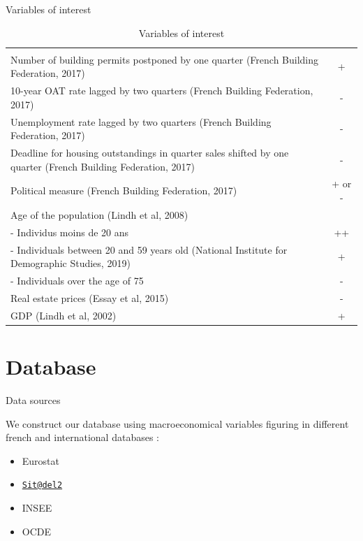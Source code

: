 \documentclass[11pt,ignorenonframetext,]{beamer}
\providecommand{\tightlist}{%
  \setlength{\itemsep}{0pt}\setlength{\parskip}{0pt}}
\begin{document}
\begin{frame}{Variables of interest}
\protect\hypertarget{variables-of-interest}{}

\tiny
\begin{table}[H]
\begin{tabular}{p{6cm} | c}
\hline \\[-1.8ex]
Number of building permits postponed by one quarter (French Building Federation, 2017) & + \\
\hline
10-year OAT rate lagged by two quarters (French Building Federation, 2017) & - \\
\hline
Unemployment rate lagged by two quarters (French Building Federation, 2017) & - \\
\hline
Deadline for housing outstandings in quarter sales shifted by one quarter (French Building Federation, 2017) & - \\
\hline
Political measure (French Building Federation, 2017)
& + or - \\
\hline
Age of the population (Lindh et al, 2008) & \\
- Individus moins de 20 ans & ++ \\
- Individuals between 20 and 59 years old (National Institute for Demographic Studies, 2019) & + \\
- Individuals over the age of 75 & -  \\
\hline
Real estate prices (Essay et al, 2015) & - \\
\hline
GDP (Lindh et al, 2002) & + \\
\hline
\end{tabular}
\normalsize
\caption{Variables of interest}
\end{table}

\end{frame}

\hypertarget{database}{%
\section{Database}\label{database}}

\begin{frame}{Data sources}
\protect\hypertarget{data-sources}{}

We construct our database using macroeconomical variables figuring in
different french and international databases :

\begin{itemize}
\tightlist
\item
  Eurostat
\item
  \href{mailto:Sit@del2}{\nolinkurl{Sit@del2}}
\item
  INSEE
\item
  OCDE
\end{itemize}

\end{frame}
\end{document}
